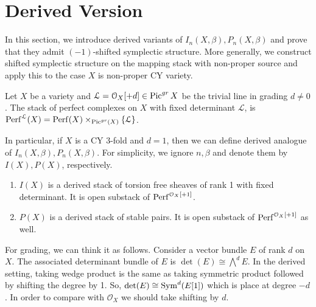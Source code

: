 \section{Derived Version}
    In this section, we introduce derived variants of $I_n(X,\beta), P_n(X, \beta)$ and prove that they admit $(-1)$-shifted symplectic structure. More generally, we construct shifted symplectic structure on the mapping stack with non-proper source and apply this to the case $X$ is non-proper CY variety.
\begin{defin}
    Let $X$ be a variety and $\mathcal{L}=\mathcal{O}_X[+d] \in \operatorname{Pic}^{gr}X$ be the trivial line in grading $d \neq 0$. The stack of perfect complexes on $X$ with fixed determinant $\mathcal{L}$, is $\mathrm{Perf}^{\mathcal{L}}(X)=\mathrm{Perf}(X) \times _{\operatorname{Pic}^{gr}(X)}\{\mathcal{L}\}$.
\end{defin}
In particular, if $X$ is a CY 3-fold and $d=1$, then we can define derived analogue of $I_n(X,\beta), P_n(X, \beta)$. For simplicity, we ignore $n, \beta$ and denote them by $I(X), P(X)$, respectively. 
\begin{enumerate}
    \item $I(X)$ is a derived stack of torsion free sheaves of rank 1 with fixed determinant. It is open substack of $\mathrm{Perf}^{\mathcal{O}_X[+1]}$.
    \item $P(X)$ is a derived stack of stable pairs. It is open substack of $\mathrm{Perf}^{\mathcal{O}_X[+1]}$ as well.
\end{enumerate}
 For grading, we can think it as follows. Consider a vector bundle $E$ of rank $d$ on $X$. The associated determinant bundle of $E$ is $\det(E) \cong \bigwedge^d E$. In the derived setting, taking wedge product is the same as taking symmetric product followed by shifting the degree by 1. So, $\det(E) \cong \operatorname{Sym}^d(E[1])$ which is place at degree $-d$. In order to compare with $\mathcal{O}_X$ we should take shifting by $d$. 

